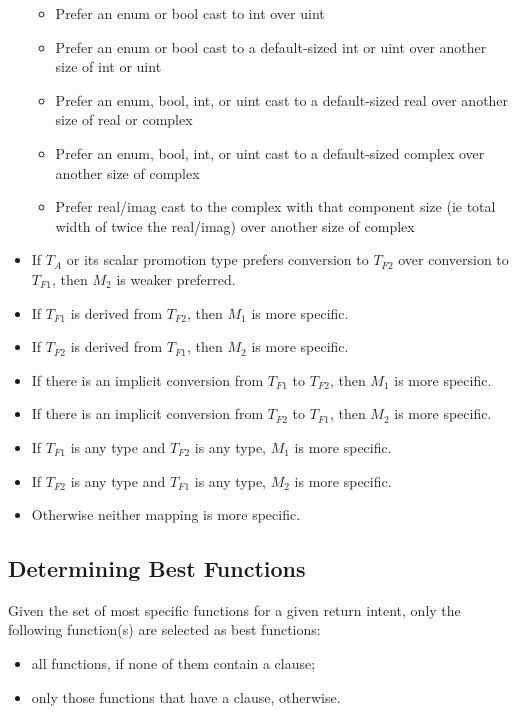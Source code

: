\begin{itemize}
\begin{itemize}
  \item Prefer an enum or bool cast to int over uint
  \item Prefer an enum or bool cast to a default-sized int or uint over another
    size of int or uint
  \item Prefer an enum, bool, int, or uint cast to a default-sized real
    over another size of real or complex
  \item Prefer an enum, bool, int, or uint cast to a default-sized
    complex over another size of complex
  \item Prefer real/imag cast to the complex with that component size (ie
    total width of twice the real/imag) over another size of complex

\end{itemize}

\item
If $T_A$ or its scalar promotion type prefers conversion to $T_{F2}$
over conversion to $T_{F1}$, then $M_2$ is weaker preferred.

\item
 If $T_{F1}$ is derived from $T_{F2}$, then $M_1$ is more specific.
\item
 If $T_{F2}$ is derived from $T_{F1}$, then $M_2$ is more specific.
\item
 If there is an implicit conversion from $T_{F1}$ to $T_{F2}$, then
 $M_1$ is more specific.
\item
 If there is an implicit conversion from $T_{F2}$ to $T_{F1}$, then
 $M_2$ is more specific.
\item
 If $T_{F1}$ is any  type and $T_{F2}$ is any 
 type, $M_1$ is more specific.
\item
 If $T_{F2}$ is any  type and $T_{F1}$ is any 
 type, $M_2$ is more specific.
\item
 Otherwise neither mapping is more specific.
\end{itemize}

\subsection{Determining Best Functions}
\label{Determining_Best_Functions}

Given the set of most specific functions for a given return intent,
only the following function(s) are selected as best functions:
\begin{itemize}
\item all functions, if none of them contain a  clause;
\item only those functions that have a  clause, otherwise.
\end{itemize}

